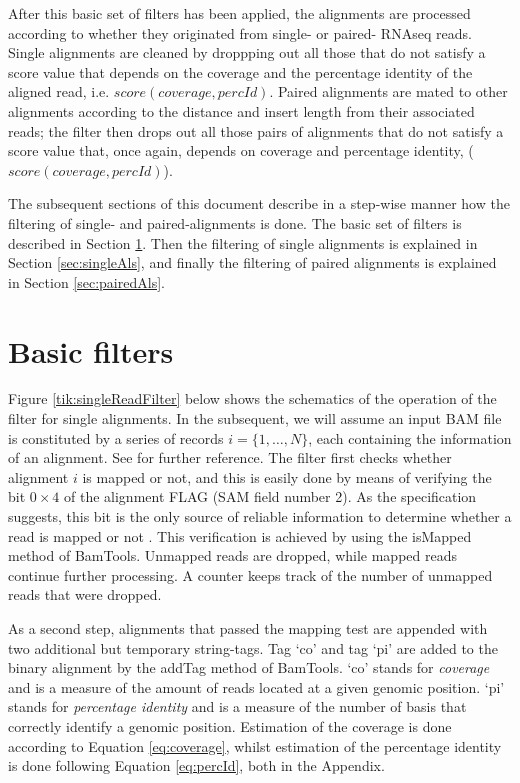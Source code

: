 \documentclass[11pt]{article}
\newcommand{\bamApi}[1]{{\fontfamily{bch}\selectfont#1}}
\begin{document}
{After this basic set of filters has been applied, the alignments are processed according to whether they 
originated from single- or paired- RNAseq reads. Single alignments are cleaned by droppping out all those 
that do not satisfy a score value that depends on the coverage and the percentage identity of the aligned read,
i.e. $score(coverage, percId)$. Paired alignments are mated to other alignments according to the distance and 
insert length from their associated reads; the filter then drops out all those pairs of alignments that do 
not satisfy a score value that, once again, depends on coverage and percentage identity, ($score(coverage, percId)$).
 
The subsequent sections of this document describe in a step-wise manner how the filtering of single- and 
paired-alignments is done. The basic set of filters is described in Section \ref{sec:basicFilters}. 
Then the filtering of single alignments is explained in Section \ref{sec:singleAls}, and finally the filtering 
of paired alignments is explained in Section \ref{sec:pairedAls}.


\section{Basic filters} \label{sec:basicFilters}
Figure \ref{tik:singleReadFilter} below shows the schematics of the operation of the filter for single 
alignments. In the subsequent, we will assume an input BAM file is constituted by a series of records 
$i=\{1,\dots,N\}$, each containing the information of an alignment. See \citep{heng09:SAM} for further 
reference. The filter first checks whether 
alignment $i$ is mapped or not, and this is easily done by means of verifying the bit $0\times4$ of the 
alignment FLAG (SAM field number 2). As the specification suggests, this bit is the only source 
of reliable information to determine whether a read is mapped or not \citet{heng09:SAM}. This verification 
is achieved by using the \bamApi{isMapped} method of BamTools. Unmapped reads are dropped, while mapped 
reads continue further processing. A counter keeps track of the number of unmapped reads that were dropped. 

As a second step, alignments that passed the mapping test are appended with two additional but temporary 
string-tags. Tag `co' and tag `pi' are added to the binary alignment by the \bamApi{addTag} method of BamTools. 
`co' stands for \emph{coverage} and is a measure of the amount of reads located at a given genomic position. 
`pi' stands for \emph{percentage identity} and is a measure of the number of basis that correctly identify 
a genomic position. Estimation of the coverage is done according to Equation \ref{eq:coverage}, whilst 
estimation of the percentage identity is done following Equation \ref{eq:percId}, both in the Appendix. 

}
\end{document}
